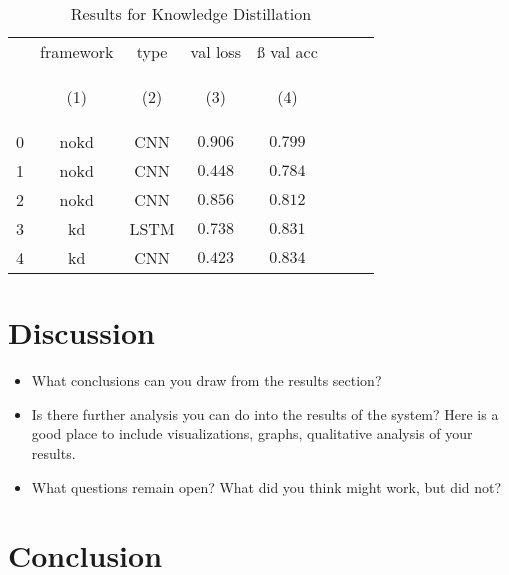 \documentclass[10pt]{article}
\begin{document}
\begin{table}[tbh]
        \caption{Results for Knowledge Distillation}
        \label{tab:kd_results}
        \centering
        \vspace{1em}
        \begin{tabular}{lccccccc}
\toprule
{} &  framework &  type &  val loss &  ß val acc \\
{} & \hypertarget{tabcol:1}{(1)} & \hypertarget{tabcol:2}{(2)} & \hypertarget{tabcol:3}{(3)} & \hypertarget{tabcol:4}{(4)} \\
\midrule
0 &        nokd &   CNN &   $0.906$ &   $0.799$ \\
1 &        nokd &   CNN &   $0.448$ &   $0.784$ \\
2 &        nokd &   CNN &   $0.856$ &   $0.812$ \\
3 &          kd &  LSTM &   $0.738$ &   $0.831$ \\
4 &          kd &   CNN &   $0.423$ &   $0.834$ \\
\bottomrule
\end{tabular}

\end{table}

\section{Discussion}



\begin{itemize}
\item What conclusions can you draw from the results section?
\item Is there further analysis you can do into the results of the system? Here is a good place to include visualizations, graphs, qualitative analysis of your results.

\item  What questions remain open? What did you think might work, but did not?
\end{itemize}




\section{Conclusion}
\end{document}
